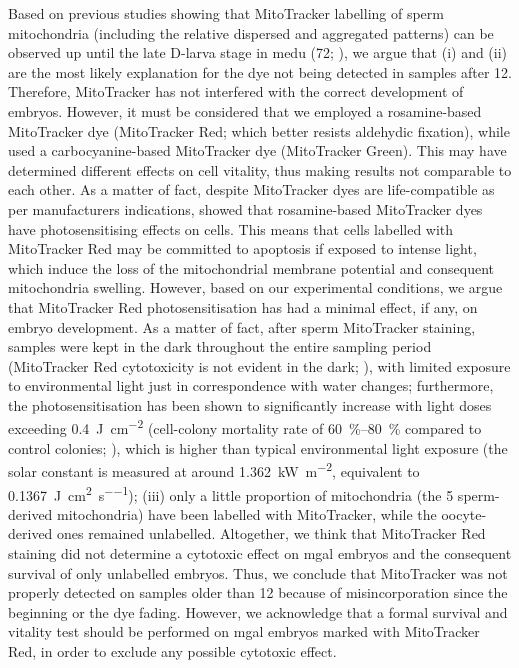 Based on previous studies showing that MitoTracker labelling of sperm mitochondria (including the relative dispersed and aggregated patterns) can be observed up until the late D-larva stage in \gls{medu} (\qty{72}{\hpf}; ), we argue that (i) and (ii) are the most likely explanation for the dye not being detected in samples after \qty{12}{\hpf}. Therefore, MitoTracker has not interfered with the correct development of embryos. However, it must be considered that we employed a rosamine-based MitoTracker dye (MitoTracker Red; which better resists aldehydic fixation), while  used a carbocyanine-based MitoTracker dye (MitoTracker Green). This may have determined different effects on cell vitality, thus making results not comparable to each other. As a matter of fact, despite MitoTracker dyes are life-compatible as per manufacturer\curlyapostrophe s indications,  showed that rosamine-based MitoTracker dyes have photosensitising effects on cells. This means that cells labelled with MitoTracker Red may be committed to apoptosis if exposed to intense light, which induce the loss of the mitochondrial membrane potential and consequent mitochondria swelling. However, based on our experimental conditions, we argue that MitoTracker Red photosensitisation has had a minimal effect, if any, on embryo development. As a matter of fact, after sperm MitoTracker staining, samples were kept in the dark throughout the entire sampling period (MitoTracker Red cytotoxicity is not evident in the dark; ), with limited exposure to environmental light just in correspondence with water changes; furthermore, the photosensitisation has been shown to significantly increase with light doses exceeding \qty{0.4}{\J\per\square\cm} (cell-colony mortality rate of \qtyrange{60}{80}{\percent} compared to control colonies; ), which is higher than typical environmental light exposure (the solar constant is measured at around \qty{1.362}{\kW\per\square\m}, equivalent to \qty{0.1367}{\J\per\square\cm\per\s}); (iii) only a little proportion of mitochondria (the 5 sperm-derived mitochondria) have been labelled with MitoTracker, while the oocyte-derived ones remained unlabelled. Altogether, we think that MitoTracker Red staining did not determine a cytotoxic effect on \gls{mgal} embryos and the consequent survival of only unlabelled embryos. Thus, we conclude that MitoTracker was not properly detected on samples older than \qty{12}{\hpf} because of misincorporation since the beginning or the dye fading. However, we acknowledge that a formal survival and vitality test should be performed on \gls{mgal} embryos marked with MitoTracker Red, in order to exclude any possible cytotoxic effect.

